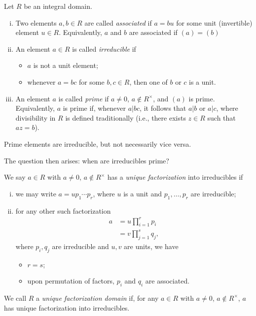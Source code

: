 \documentclass[10pt]{mypackage}
\begin{document}
\begin{definition}
  Let $R$ be an integral domain.
  \begin{enumerate}[(i)]
    \item Two elements $a,b\in R$ are called \textit{associated} if $a = bu$ for some unit (invertible) element $u\in R$. Equivalently, $a$ and $b$ are associated if $\left( a \right) = \left( b \right)$
    \item An element $a\in R$ is called \textit{irreducible} if
      \begin{itemize}
        \item $a$ is not a unit element;
        \item whenever $a = bc$ for some $b,c\in R$, then one of $b$ or $c$ is a unit.
      \end{itemize}
    \item An element $a$ is called \textit{prime} if $a\neq 0$, $a\notin R^{\times}$, and $\left( a \right)$ is prime. Equivalently, $a$ is prime if, whenever $a | bc$, it follows that $a | b$ or $a | c$, where divisibility in $R$ is defined traditionally (i.e., there exists $z\in R$ such that $az = b$).
  \end{enumerate}
\end{definition}
\begin{note}
  Prime elements are irreducible, but not necessarily vice versa.
\end{note}
The question then arises: when are irreducibles prime?
\begin{definition}
  We say $a\in R$ with $a\neq 0$, $a\notin R^{\times}$ has a \textit{unique factorization} into irreducibles if
  \begin{enumerate}[(i)]
    \item we may write $a = u p_1\cdots p_r$, where $u$ is a unit and $p_1,\dots,p_r$ are irreducible;
    \item for any other such factorization
      \begin{align*}
        a &= u\prod_{i=1}^{r}p_i\\
          &= v\prod_{j=1}^{s} q_j,
      \end{align*}
      where $p_i,q_j$ are irreducible and $u,v$ are units, we have
      \begin{itemize}
        \item $r = s$;
        \item upon permutation of factors, $p_i$ and $q_i$ are associated.
      \end{itemize}
  \end{enumerate}
  We call $R$ a \textit{unique factorization domain} if, for any $a\in R$ with $a\neq 0$, $a\notin R^{\times}$, $a$ has unique factorization into irreducibles.
\end{definition}
\end{document}
